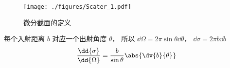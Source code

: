 
\begin{issues}
\issueDraft
\end{issues}



\begin{figure}[ht]
\centering
\texttt{[image: ./figures/Scater\_1.pdf]}
\caption{微分截面的定义} \label{Scater_fig1}
\end{figure}

每个入射距离 $b$ 对应一个出射角度 $\theta$， 所以 $\dd\Omega = 2\pi \sin\theta \dd{\theta}$， $\dd{\sigma} = 2\pi b \dd{b}$
\begin{equation}
\frac{\dd{\sigma}}{\dd{\Omega}} = \frac{b}{\sin\theta} \abs{\dv{b}{\theta}}
\end{equation}

